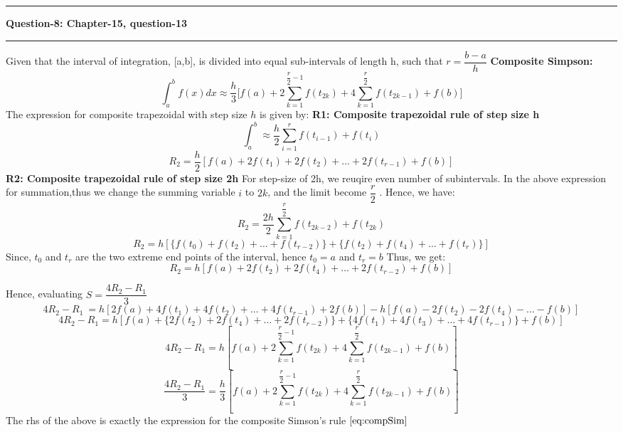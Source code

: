 \documentclass{article}
\newcommand\question[2]{\vspace{.25in}\hrule\textbf{#1: #2}\hrule\vspace{.10in}}
\begin{document}
  \question{Question-8}{Chapter-15, question-13}
  Given that the interval of integration, [a,b], is divided into equal sub-intervals of length h, such that $r = \dfrac{b-a}{h}$
  \textbf {Composite Simpson:}\newline
  \begin{equation}
	  \int_{a}^{b} f(x) dx \approx \dfrac{h}{3}\bigg [ f(a) + 2\sum_{k=1}^{\dfrac{r}{2}-1} f(t_{2k}) + 4\sum_{k=1}^{\dfrac{r}{2}}f(t_{2k-1}) + f(b)\bigg ]
	  \label{eq:compSim}
  \end{equation}
  The expression for composite trapezoidal with step size $h$ is given by: \newline
  \textbf {R1: Composite trapezoidal rule of step size h}
  \[ \int_{a}^{b} \approx \dfrac{h}{2} \sum_{i=1}^{r} f(t_{i-1}) + f(t_i)\]
  \[R_2 = \dfrac{h}{2}[ f(a) + 2f(t_1) + 2f(t_2) + \dots + 2f(t_{r-1}) + f(b) ]\]
  \textbf {R2: Composite trapezoidal rule of step size 2h}
  For step-size of 2h, we reuqire even number of subintervals. In the above expression for summation,thus we change the summing variable $i$ to $2k$, and the limit become $\dfrac{r}{2}$ . Hence, we have:
  \[R_2 = \dfrac{2h}{2}\sum_{k=1}^{\dfrac{r}{2}} f(t_{2k-2}) + f(t_{2k})\]
  \[R_2 = h[ \{f(t_0) + f(t_2) + \dots + f(t_{r-2})\} + \{ f(t_2) + f(t_4) + \dots + f(t_r) \} ]\]
  Since, $t_0$ and $t_r$ are the two extreme end points of the interval, hence $t_0 = a$ and $t_r = b$
  Thus, we get:
  \[R_2 = h[f(a) + 2f(t_2) + 2f(t_4) + \dots + 2f(t_{r-2}) + f(b)]\]

  Hence, evaluating $S = \dfrac{4R_2 - R_1}{3}$
  \[4R_2 - R_1\ = h[2f(a) + 4f(t_1) + 4f(t_2)+\dots+4f(t_{r-1}) + 2f(b)] - h[f(a) - 2f(t_2) - 2f(t_4) - \dots-f(b)]\]
  \[4R_2 - R_1 = h[ f(a) + \{2f(t_2) + 2f(t_4) +\dots+2f(t_{r-2})\} + \{ 4f(t_1)+4f(t_3) + \dots+4f(t_{r-1})\} + f(b) ]\]
  \[4R_2 - R_1 = h[ f(a) + 2\sum_{k=1}^{\dfrac{r}{2}-1}f(t_{2k}) + 4\sum_{k=1}^{\dfrac{r}{2}}f(t_{2k-1}) + f(b)]\]
  \[\dfrac{4R_2 - R_1}{3} = \dfrac{h}{3}[ f(a) + 2\sum_{k=1}^{\dfrac{r}{2}-1}f(t_{2k}) + 4\sum_{k=1}^{\dfrac{r}{2}}f(t_{2k-1}) + f(b)]\]
  The rhs of the above is exactly the expression for the composite Simson's rule $\eqref{eq:compSim}$
\end{document}
